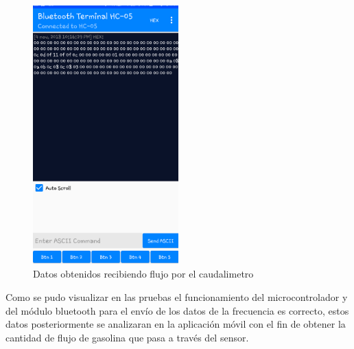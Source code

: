 \begin{figure}[H]
	\centering
	\includegraphics[width=0.5\textwidth]{Capitulo6/unitarias/hardware/img/bt_datos_flujo}
	\caption{Datos obtenidos recibiendo flujo por el caudalimetro}
	\label{fig:bt_datos_flujo}
\end{figure}
Como se pudo visualizar en las pruebas el funcionamiento del microcontrolador y del módulo bluetooth para el envío de los datos de la frecuencia es correcto, estos datos posteriormente se analizaran en la aplicación móvil con el fin de obtener la cantidad de flujo de gasolina que pasa a través del sensor.